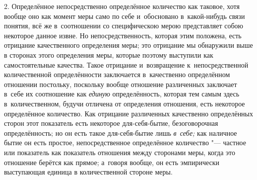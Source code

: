 2. Определённое непосредственно определённое количество как таковое, хотя
вообще оно как момент меры само по себе и~обосновано в~какой-нибудь связи
понятия, всё же в~соотношении со специфическою мерою представляет собою
некоторое данное извне. Но непосредственность, которая этим положена, есть
отрицание качественного определения меры; это отрицание мы обнаружили выше в
сторонах этого определения меры, которые поэтому выступили как самостоятельные
качества. Такое отрицание и~возвращение к~непосредственной количественной
определённости заключается в~качественно определённом отношении постольку,
поскольку вообще отношение различенных заключает в~себе их соотношение как
{\em единую} определённость, которая тем самым здесь в~количественном, будучи
отличена от определения отношения, есть некоторое определённое количество. Как
отрицание различенных качественно определённых сторон этот показатель есть
некоторое для-себя-бытие, безоговорочная определённость; но он есть такое
для-себя-бытие лишь {\em в~себе;} как наличное бытие он есть простое,
непосредственное определённое количество "--- частное или показатель как
показатель отношения между сторонами меры, когда это отношение берётся как
прямое; а~говоря вообще, он есть эмпирически выступающая единица в
количественной стороне меры.
